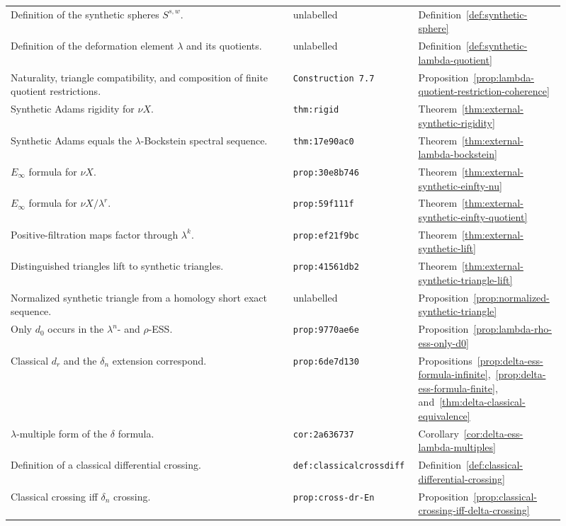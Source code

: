 \begin{center}
\begin{tabular}{p{0.49\linewidth}p{0.17\linewidth}p{0.25\linewidth}}
Definition of the synthetic spheres $S^{s,w}$. & unlabelled & Definition~\ref{def:synthetic-sphere} \\
Definition of the deformation element $\lambda$ and its quotients. & unlabelled & Definition~\ref{def:synthetic-lambda-quotient} \\
Naturality, triangle compatibility, and composition of finite quotient restrictions. & \texttt{Construction 7.7} & Proposition~\ref{prop:lambda-quotient-restriction-coherence} \\
Synthetic Adams rigidity for $\nu X$. & \texttt{thm:rigid} & Theorem~\ref{thm:external-synthetic-rigidity} \\
Synthetic Adams equals the $\lambda$-Bockstein spectral sequence. & \texttt{thm:17e90ac0} & Theorem~\ref{thm:external-lambda-bockstein} \\
$E_\infty$ formula for $\nu X$. & \texttt{prop:30e8b746} & Theorem~\ref{thm:external-synthetic-einfty-nu} \\
$E_\infty$ formula for $\nu X/\lambda^r$. & \texttt{prop:59f111f} & Theorem~\ref{thm:external-synthetic-einfty-quotient} \\
Positive-filtration maps factor through $\lambda^k$. & \texttt{prop:ef21f9bc} & Theorem~\ref{thm:external-synthetic-lift} \\
Distinguished triangles lift to synthetic triangles. & \texttt{prop:41561db2} & Theorem~\ref{thm:external-synthetic-triangle-lift} \\
Normalized synthetic triangle from a homology short exact sequence. & unlabelled & Proposition~\ref{prop:normalized-synthetic-triangle} \\
Only $d_0$ occurs in the $\lambda^n$- and $\rho$-ESS. & \texttt{prop:9770ae6e} & Proposition~\ref{prop:lambda-rho-ess-only-d0} \\
Classical $d_r$ and the $\delta_n$ extension correspond. & \texttt{prop:6de7d130} & Propositions~\ref{prop:delta-ess-formula-infinite},~\ref{prop:delta-ess-formula-finite}, and~\ref{thm:delta-classical-equivalence} \\
$\lambda$-multiple form of the $\delta$ formula. & \texttt{cor:2a636737} & Corollary~\ref{cor:delta-ess-lambda-multiples} \\
Definition of a classical differential crossing. & \texttt{def:classicalcrossdiff} & Definition~\ref{def:classical-differential-crossing} \\
Classical crossing iff $\delta_n$ crossing. & \texttt{prop:cross-dr-En} & Proposition~\ref{prop:classical-crossing-iff-delta-crossing} \\

\end{tabular}
\end{center}
